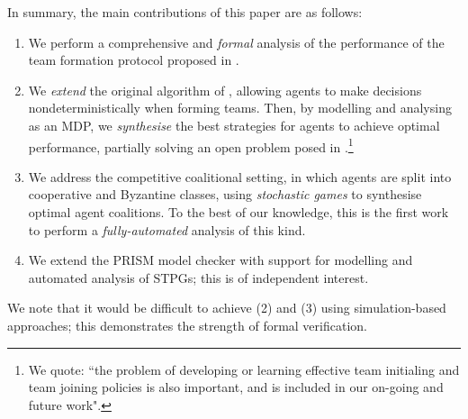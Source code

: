 \documentclass{llncs}
\newcommand{\comment}[1]{\marginpar{\footnotesize \color{red} \textsf{#1}}}
\begin{document}
%


In summary, the main contributions of this paper are as follows:
\begin{enumerate}
  \renewcommand{\labelenumi}{(\arabic{enumi})}
  \item We perform a comprehensive and \emph{formal} analysis of the performance of the team formation protocol proposed in \cite{gaston2005agent}.

  \item  We \emph{extend} the original algorithm of \cite{gaston2005agent}, allowing agents to make decisions nondeterministically when forming teams. Then, by modelling and analysing as an MDP, we \emph{synthesise} the best strategies for agents to achieve optimal performance, partially solving an open problem posed in \cite{gaston2005agent}.\footnote{We quote: ``the problem of developing or learning effective team initialing and team joining policies is also important, and is included in our on-going and future work".}

  \item  We address the competitive coalitional setting, in which agents are split into cooperative and Byzantine classes, using \emph{stochastic games} to synthesise optimal agent coalitions. To the best of our knowledge, this is the first work to perform a \emph{fully-automated} analysis of this kind.

  \item We extend the  PRISM model checker with support for modelling and automated analysis of STPGs;
  this is of independent interest.
\end{enumerate}
%
We note that it would be difficult to achieve (2) and (3) using simulation-based approaches;
this demonstrates the strength of formal verification.
\end{document}

